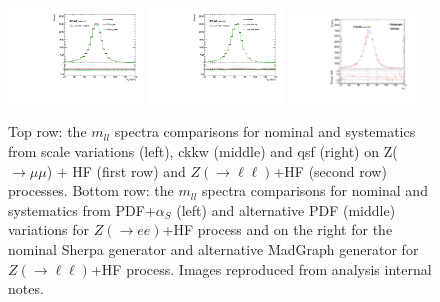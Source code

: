 \begin{figure}
\includegraphics[width=0.32\textwidth]{figures/appendix/ZHFSys/Zee_pdf.pdf}
\includegraphics[width=0.32\textwidth]{figures/appendix/ZHFSys/Zee_alt_pdf.pdf}
\includegraphics[width=0.3\textwidth]{figures/appendix/ZHFSys/Zhf_MGvsSherpa.pdf} 
\caption{Top row: the $m_{ll}$ spectra comparisons for nominal
 and systematics from scale variations
(left), ckkw (middle) and qsf (right) on Z($\rightarrow \mu \mu$) 
+ HF (first row) and $Z(\rightarrow \ell\ell)$+HF (second row) processes.
Bottom row: the $m_{ll}$ spectra comparisons for nominal and 
systematics from PDF+$\alpha_{S}$ (left)
and alternative PDF (middle) variations for $Z(\rightarrow ee)$+HF 
process and on the right for the nominal Sherpa generator and alternative MadGraph 
generator for $Z(\rightarrow \ell\ell)$+HF process.
Images reproduced from analysis internal notes. 
}
\label{fig:append:ZHF}
\end{figure}



